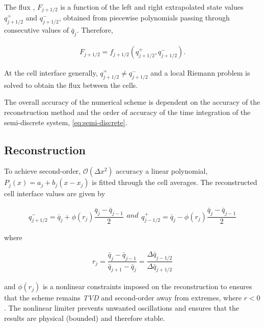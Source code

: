\documentclass[SingleSpace,12pt]{Serre_ASCE}
\begin{document}
The flux , $F_{j+1/2}$ is a function of the left and right extrapolated state values $q^+_{j+1/2}$ and $q^-_{j+1/2}$, obtained from piecewise polynomials passing through consecutive values of $\bar{q}_j$. Therefore,
\begin{linenomath*}
\begin{gather*}
F_{j+1/2} = f_{j+1/2}(q_{j+1/2}^+,q_{j+1/2}^-).
\end{gather*}
\end{linenomath*}
At the cell interface generally, $q^+_{j+1/2} \ne q^-_{j+1/2}$ and a local Riemann problem is solved to obtain the flux between the cells.

The overall accuracy of the numerical scheme is dependent on the accuracy of the reconstruction method and the order of accuracy of the time integration of the semi-discrete system, \eqref{eq:semi-discrete}.

\subsection{Reconstruction}

To achieve second-order, $\mathcal{O}(\Delta x^2)$ accuracy a linear polynomial, $P_j(x) = a_j + b_j(x - x_j)$ is fitted through the cell averages. The reconstructed cell interface values are given by
\begin{linenomath*}
\begin{subequations}\label{eq:linear_reconstruction}
\begin{gather}
q^-_{j+1/2} = \bar{q}_j + \phi(r_j) \dfrac{\bar{q}_j - \bar{q}_{j-1}}{2}
\end{gather}
and
\begin{gather}
q^+_{j-1/2} = \bar{q}_j - \phi(r_j) \dfrac{\bar{q}_j - \bar{q}_{j-1}}{2}
\end{gather}
\end{subequations}
\end{linenomath*}
where
\begin{linenomath*}
\begin{gather*}
r_j = \dfrac{\bar{q}_j - \bar{q}_{j-1}}{\bar{q}_{j+1} - \bar{q}_j} = \dfrac{\Delta \bar{q}_{j-1/2}}{\Delta \bar{q}_{j+1/2}}
\end{gather*}
\end{linenomath*}
and $\phi(r_j)$ is a nonlinear constraints imposed on the reconstruction to ensures that the scheme remains \emph{TVD} and second-order away from extremes, where $r < 0$.  The nonlinear limiter prevents unwanted oscillations and ensures that the results are physical (bounded) and therefore stable.
\end{document}
